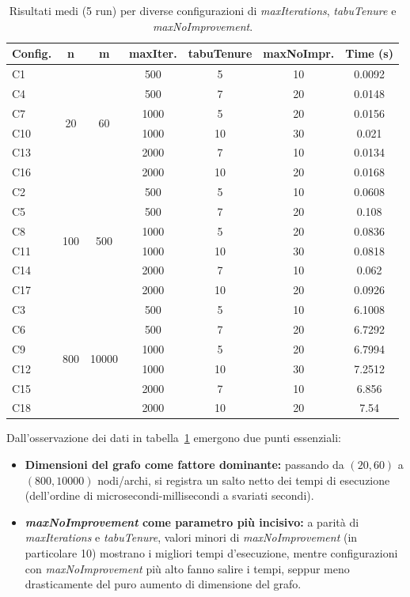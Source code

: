 \begin{table}[h!]
\centering
\caption{Risultati medi (5 run) per diverse configurazioni di \emph{maxIterations}, \emph{tabuTenure} e \emph{maxNoImprovement}.}
\label{tab:risultati1}
\begin{tabular}{l|c|c|c|c|c|c}
\hline
\textbf{Config.} & \textbf{n} & \textbf{m} & \textbf{maxIter.} & \textbf{tabuTenure} & \textbf{maxNoImpr.} & \textbf{Time (s)} \\
\hline
C1 & \multirow{6}{*}{20} & \multirow{6}{*}{60}  
& 500  & 5  & 10 & 0.0092 \\
C4 & &  & 500  & 7  & 20 & 0.0148 \\
C7 & & & 1000 & 5  & 20 & 0.0156 \\
C10 & & & 1000 & 10 & 30 & 0.021 \\
C13 & & & 2000 & 7  & 10 & 0.0134 \\
C16 & & & 2000 & 10 & 20 & 0.0168 \\
\hline
C2 & \multirow{6}{*}{100} & \multirow{6}{*}{500}  
& 500  & 5  & 10 & 0.0608 \\
C5 & & & 500  & 7  & 20 & 0.108 \\
C8 & & & 1000 & 5  & 20 & 0.0836 \\
C11 & & & 1000 & 10 & 30 & 0.0818 \\
C14 & & & 2000 & 7  & 10 & 0.062 \\
C17 & & & 2000 & 10 & 20 & 0.0926 \\
\hline
C3 & \multirow{6}{*}{800} & \multirow{6}{*}{10000}  
& 500  & 5  & 10 & 6.1008 \\
C6 & & & 500  & 7  & 20 & 6.7292 \\
C9 & & & 1000 & 5  & 20 & 6.7994 \\
C12 & & & 1000 & 10 & 30 & 7.2512 \\
C15 & & & 2000 & 7  & 10 & 6.856 \\
C18 & & & 2000 & 10 & 20 & 7.54 \\
\hline
\end{tabular}
\end{table}

\noindent
Dall’osservazione dei dati in tabella~\ref{tab:risultati1} emergono due punti essenziali:
\begin{itemize}
    \item \textbf{Dimensioni del grafo come fattore dominante:}
    passando da \((20,60)\) a \((800,10000)\) nodi/archi, si registra un salto netto dei tempi di esecuzione (dell’ordine di microsecondi-millisecondi a svariati secondi).

    \item \textbf{\emph{maxNoImprovement} come parametro più incisivo:}
    a parità di \emph{maxIterations} e \emph{tabuTenure}, valori minori di \emph{maxNoImprovement} (in particolare 10) mostrano i migliori tempi d’esecuzione, mentre configurazioni con \emph{maxNoImprovement} più alto fanno salire i tempi, seppur meno drasticamente del puro aumento di dimensione del grafo.
\end{itemize}

